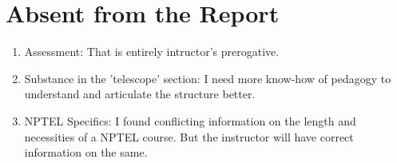 \documentclass[12pt]{article}
\begin{document}
\section{Absent from the Report}
\begin{enumerate}
    \item Assessment: That is entirely intructor's prerogative.
    \item Substance in the 'telescope' section: I need more know-how of pedagogy to understand and articulate the structure better.
    \item NPTEL Specifics: I found conflicting information on the length and necessities of a NPTEL course. But the instructor will have correct information on the same.
\end{enumerate}
\end{document}
